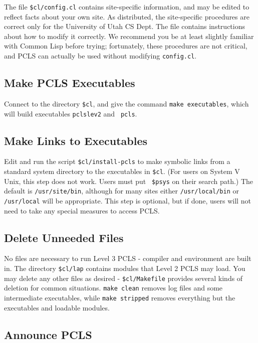 The file {\tt \$cl/config.cl} contains site-specific information, and may
be edited to reflect facts about your own site.  As distributed, the
site-specific procedures are correct only for the University of Utah CS
Dept.  The file contains instructions about how to modify it
correctly.  We recommend you be at least slightly familiar with Common
Lisp before trying; fortunately, these procedures are not critical, and
PCLS can actually be used without modifying {\tt config.cl}.

\subsection{Make PCLS Executables}

Connect to the directory {\tt \$cl}, and give the command {\tt make
executables}, which will build executables {\tt pclslev2} and {\tt
pcls}.

\subsection{Make Links to Executables}

Edit and run the script {\tt \$cl/install-pcls} to make symbolic links
from a standard system directory to the executables in {\tt \$cl}. (For
users on System V Unix, this step does not work.  Users must put {\tt
\$psys} on their search path.)  The default is {\tt /usr/site/bin},
although for many sites either {\tt /usr/local/bin} or {\tt
/usr/local} will be appropriate.  This step is optional, but if done,
users will not need to take any special measures to access PCLS.

\subsection{Delete Unneeded Files}

No files are necessary to run Level 3 PCLS - compiler and environment
are built in.  The directory {\tt \$cl/lap} contains modules that
Level 2 PCLS may load.  You may delete any other files as desired -
{\tt \$cl/Makefile} provides several kinds of deletion for common
situations.  {\tt make clean} removes log files and some intermediate
executables, while {\tt make stripped} removes everything but the
executables and loadable modules.

\subsection{Announce PCLS}

